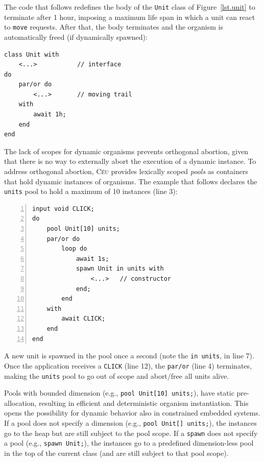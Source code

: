 \documentclass{sigplanconf}
\newcommand{\CEU}{\textsc{C\'{e}u}\xspace}
\newcommand{\code}[1] {{\small{\texttt{#1}}}}
\newcommand{\1}{\;}
\newcommand{\2}{\;\;}
\newcommand{\3}{\;\;\;}
\newcommand{\5}{\;\;\;\;\;}
\begin{document}
The code that follows redefines the body of the \code{Unit} class of 
Figure~\ref{lst.unit} to terminate after 1 hour, imposing a maximum life span 
in which a unit can react to \code{move} requests.
After that, the body terminates and the organism is automatically freed (if 
dynamically spawned):

\begin{lstlisting}
class Unit with
    <...>           // interface
do
    par/or do
        <...>       // moving trail
    with
        await 1h;
    end
end
\end{lstlisting}

The lack of scopes for dynamic organisms prevents orthogonal abortion, given 
that there is no way to externally abort the execution of a dynamic instance.
%
To address orthogonal abortion, \CEU provides lexically scoped \emph{pools} as 
containers that hold dynamic instances of organisms.
%
The example that follows declares the \code{units} pool to hold a maximum of 10 
instances (line 3):


\begin{lstlisting}[numbers=left,xleftmargin=3em]
input void CLICK;
do
    pool Unit[10] units;
    par/or do
        loop do
            await 1s;
            spawn Unit in units with
                <...>   // constructor
            end;
        end
    with
        await CLICK;
    end
end
\end{lstlisting}

A new unit is spawned in the pool once a second (note the \code{in units}, in 
line 7).
Once the application receives a \code{CLICK} (line 12), the \code{par/or} (line 
4) terminates, making the \code{units} pool to go out of scope and abort/free 
all units alive.

Pools with bounded dimension (e.g., \code{pool Unit[10] units;}), have static 
pre-allocation, resulting in efficient and deterministic organism 
instantiation.
This opens the possibility for dynamic behavior also in constrained embedded 
systems.
%
If a pool does not specify a dimension (e.g., \code{pool Unit[] units;}), the 
instances go to the heap but are still subject to the pool scope.
%
If a \code{spawn} does not specify a pool (e.g., \code{spawn Unit;}), the 
instances go to a predefined dimension-less pool in the top of the current 
class (and are still subject to that pool scope).
\end{document}
